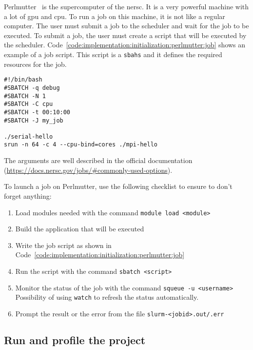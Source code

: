 Perlmutter~\cite{Perlmutter} is the supercomputer of the \acrshort{nersc}.
It is a very powerful machine with a lot of \acrshort{gpu} and \acrshort{cpu}.
To run a job on this machine, it is not like a regular computer.
The user must submit a job to the scheduler and wait for the job to be executed.
To submit a job, the user must create a script that will be executed by the
scheduler.
Code~\ref{code:implementation:initialization:perlmutter:job} shows an example
of a job script.
This script is a \texttt{sbahs} and it defines the required resources for the
job.

\begin{code}
    \label{code:implementation:initialization:perlmutter:job}
    \begin{verbatim}
#!/bin/bash
#SBATCH -q debug
#SBATCH -N 1
#SBATCH -C cpu
#SBATCH -t 00:10:00
#SBATCH -J my_job

./serial-hello
srun -n 64 -c 4 --cpu-bind=cores ./mpi-hello
    \end{verbatim}
\end{code}

The arguments are well described in the official documentation
(\url{https://docs.nersc.gov/jobs/#commonly-used-options}).

To launch a job on Perlmutter, use the following checklist to ensure to don't
forget anything:

\begin{enumerate}
    \item Load modules needed with the command \texttt{module load <module>}
    \item Build the application that will be executed
    \item Write the job script as shown in Code~\ref{code:implementation:initialization:perlmutter:job}
    \item Run the script with the command \texttt{sbatch <script>}
    \item Monitor the status of the job with the command \texttt{squeue -u <username>}
          Possibility of using \texttt{watch} to refresh the status automatically.
    \item Prompt the result or the error from the file \texttt{slurm-<jobid>.out/.err}
\end{enumerate}

\subsection{Run and profile the project}
\label{ch:implementation:initialization:run}

